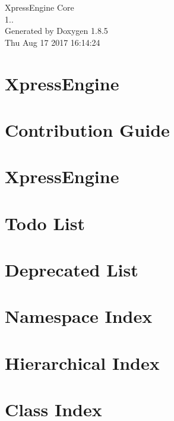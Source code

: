 \documentclass[twoside]{book}
\newcommand{\clearemptydoublepage}{%
  \newpage{\pagestyle{empty}\cleardoublepage}%
}
\begin{document}
\hypersetup{pageanchor=false}
\begin{titlepage}
\vspace*{7cm}
\begin{center}%
{\Large Xpress\-Engine Core \\[1ex]\large 1.. }\\
\vspace*{1cm}
{\large Generated by Doxygen 1.8.5}\\
\vspace*{0.5cm}
{\small Thu Aug 17 2017 16:14:24}\\
\end{center}
\end{titlepage}
\clearemptydoublepage
\tableofcontents
\clearemptydoublepage
{}
\hypersetup{pageanchor=true}

\chapter{Xpress\-Engine}
\label{index}\hypertarget{index}{}
\chapter{Contribution Guide}
\label{md_CONTRIBUTING}
\hypertarget{md_CONTRIBUTING}{}

\chapter{Xpress\-Engine}
\label{md_README}
\hypertarget{md_README}{}

\chapter{Todo List}
\label{todo}
\hypertarget{todo}{}

\chapter{Deprecated List}
\label{deprecated}
\hypertarget{deprecated}{}

\chapter{Namespace Index}

\chapter{Hierarchical Index}

\chapter{Class Index}

\end{document}
